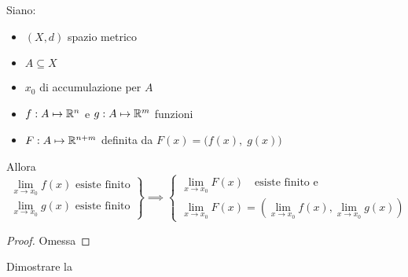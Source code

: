 \begin{proposition}
	\label{prop:lim_in_R_coord_F}
	Siano:
	\begin{itemize}
		\item $(X,d)$ spazio metrico
		\item $A \subseteq X$
		\item $x_0$ di accumulazione per $A$
		\item $f: A \mapsto \mathbb{R}^n$ e $g: A \mapsto \mathbb{R}^m$ funzioni
		\item $F: A \mapsto \mathbb{R}^{n+m}$ definita da $F(x) = \bigl( f(x),\; g(x) \bigr)$
	\end{itemize}
	Allora
	\begin{equation*}
		\left.
		\begin{array}{r}
			\lim\limits_{x \to x_0} f(x) \text{ esiste finito}\\
			\lim\limits_{x \to x_0} g(x) \text{ esiste finito}
		\end{array}
		\right\}
		\implies
		\left\{
		\begin{array}{l}
			\lim\limits_{x \to x_0} F(x) \quad \text{esiste finito e}\\
			\lim\limits_{x \to x_0} F(x) = \left( \lim\limits_{x \to x_0} f(x), \lim\limits_{x \to x_0} g(x) \right)
		\end{array}
		\right.
	\end{equation*}
	\begin{proof}
		Omessa
	\end{proof}
\end{proposition}
\begin{exercise}
	Dimostrare la 
\end{exercise}
